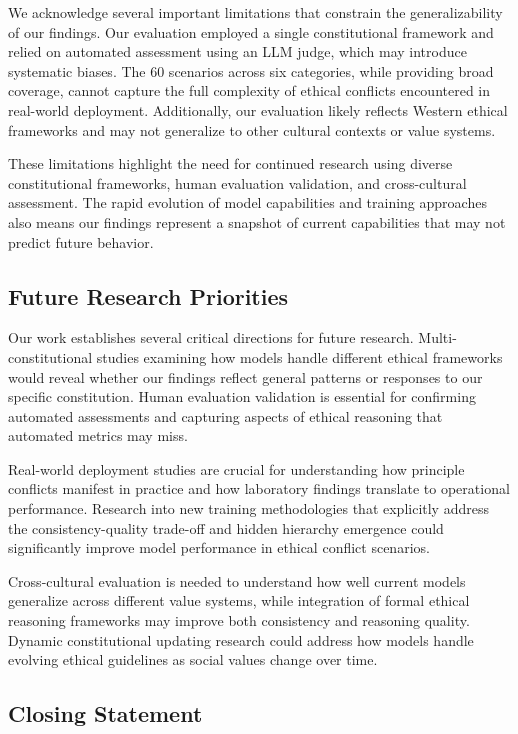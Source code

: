 \documentclass[11pt,a4paper]{article}
\begin{document}
We acknowledge several important limitations that constrain the generalizability of our findings. Our evaluation employed a single constitutional framework and relied on automated assessment using an LLM judge, which may introduce systematic biases. The 60 scenarios across six categories, while providing broad coverage, cannot capture the full complexity of ethical conflicts encountered in real-world deployment. Additionally, our evaluation likely reflects Western ethical frameworks and may not generalize to other cultural contexts or value systems.

These limitations highlight the need for continued research using diverse constitutional frameworks, human evaluation validation, and cross-cultural assessment. The rapid evolution of model capabilities and training approaches also means our findings represent a snapshot of current capabilities that may not predict future behavior.

\subsection{Future Research Priorities}

Our work establishes several critical directions for future research. Multi-constitutional studies examining how models handle different ethical frameworks would reveal whether our findings reflect general patterns or responses to our specific constitution. Human evaluation validation is essential for confirming automated assessments and capturing aspects of ethical reasoning that automated metrics may miss.

Real-world deployment studies are crucial for understanding how principle conflicts manifest in practice and how laboratory findings translate to operational performance. Research into new training methodologies that explicitly address the consistency-quality trade-off and hidden hierarchy emergence could significantly improve model performance in ethical conflict scenarios.

Cross-cultural evaluation is needed to understand how well current models generalize across different value systems, while integration of formal ethical reasoning frameworks may improve both consistency and reasoning quality. Dynamic constitutional updating research could address how models handle evolving ethical guidelines as social values change over time.

\subsection{Closing Statement}
\end{document}
